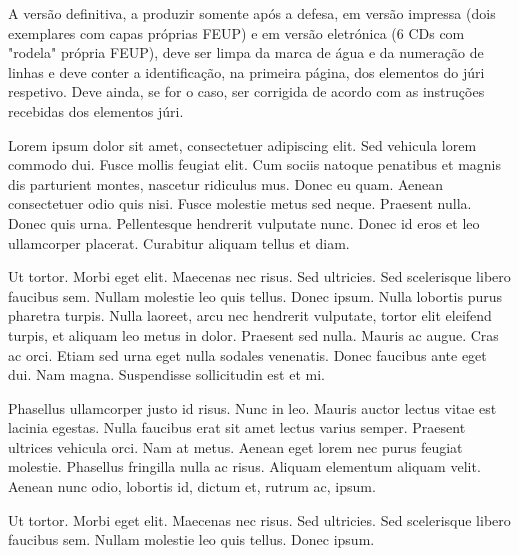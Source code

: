A versão definitiva, a produzir somente após a defesa, em versão impressa (dois
exemplares com capas próprias FEUP) e em versão eletrónica (6 CDs com "rodela"
própria FEUP), deve ser limpa da marca de água e da numeração de linhas e deve
conter a identificação, na primeira página, dos elementos do júri respetivo.
Deve ainda, se for o caso, ser corrigida de acordo com as instruções recebidas
dos elementos júri.

Lorem ipsum dolor sit amet, consectetuer adipiscing elit. Sed vehicula lorem
commodo dui. Fusce mollis feugiat elit. Cum sociis natoque penatibus et magnis
dis parturient montes, nascetur ridiculus mus. Donec eu quam. Aenean
consectetuer odio quis nisi. Fusce molestie metus sed neque. Praesent nulla.
Donec quis urna. Pellentesque hendrerit vulputate nunc. Donec id eros et leo
ullamcorper placerat. Curabitur aliquam tellus et diam. 

Ut tortor. Morbi eget elit. Maecenas nec risus. Sed ultricies. Sed scelerisque
libero faucibus sem. Nullam molestie leo quis tellus. Donec ipsum. Nulla
lobortis purus pharetra turpis. Nulla laoreet, arcu nec hendrerit vulputate,
tortor elit eleifend turpis, et aliquam leo metus in dolor. Praesent sed nulla.
Mauris ac augue. Cras ac orci. Etiam sed urna eget nulla sodales venenatis.
Donec faucibus ante eget dui. Nam magna. Suspendisse sollicitudin est et mi. 

Phasellus ullamcorper justo id risus. Nunc in leo. Mauris auctor lectus vitae
est lacinia egestas. Nulla faucibus erat sit amet lectus varius semper.
Praesent ultrices vehicula orci. Nam at metus. Aenean eget lorem nec purus
feugiat molestie. Phasellus fringilla nulla ac risus. Aliquam elementum aliquam
velit. Aenean nunc odio, lobortis id, dictum et, rutrum ac, ipsum. 

Ut tortor. Morbi eget elit. Maecenas nec risus. Sed ultricies. Sed scelerisque
libero faucibus sem. Nullam molestie leo quis tellus. Donec ipsum. 
